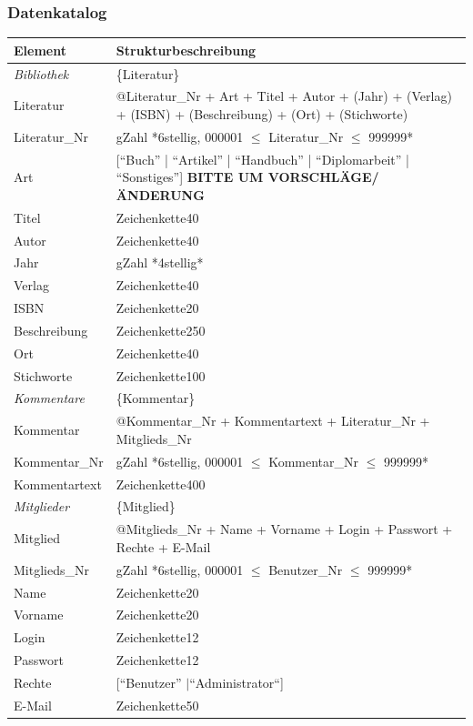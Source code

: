 \subsubsection{Datenkatalog}
\begin{longtable}{|l|p{8.5cm}|}
\hline
Element & Strukturbeschreibung \\
\hline\hline
\endhead

\emph{Bibliothek} & \{Literatur\} \\
\hline
Literatur & @Literatur\_Nr + Art + Titel + Autor + (Jahr) + (Verlag) + (ISBN) + (Beschreibung) + (Ort) + (Stichworte) \\
\hline
Literatur\_Nr & gZahl *6stellig, 000001 $\leq$ Literatur\_Nr $\leq$ 999999* \\
\hline
Art & [``Buch'' | ``Artikel'' | ``Handbuch'' | ``Diplomarbeit'' | ``Sonstiges''] \textbf{BITTE UM VORSCHLÄGE/ÄNDERUNG}\\
\hline
Titel & Zeichenkette40 \\
\hline
Autor & Zeichenkette40 \\
\hline
Jahr & gZahl *4stellig* \\
\hline
Verlag & Zeichenkette40 \\
\hline
ISBN & Zeichenkette20 \\
\hline
Beschreibung & Zeichenkette250 \\
\hline
Ort & Zeichenkette40 \\
\hline
Stichworte & Zeichenkette100 \\
\hline\hline

\emph{Kommentare} & \{Kommentar\} \\
\hline
Kommentar & @Kommentar\_Nr + Kommentartext + Literatur\_Nr + Mitglieds\_Nr\\
\hline
Kommentar\_Nr & gZahl *6stellig, 000001 $\leq$ Kommentar\_Nr $\leq$ 999999* \\
\hline
Kommentartext & Zeichenkette400 \\
\hline\hline

\emph{Mitglieder} & \{Mitglied\} \\
\hline
Mitglied  & @Mitglieds\_Nr  + Name + Vorname + Login + Passwort + Rechte + E-Mail\\
\hline
Mitglieds\_Nr & gZahl *6stellig, 000001 $\leq$ Benutzer\_Nr $\leq$ 999999* \\ 
\hline
Name & Zeichenkette20 \\
\hline
Vorname & Zeichenkette20 \\
\hline
Login & Zeichenkette12 \\
\hline
Passwort & Zeichenkette12 \\
\hline
Rechte & [``Benutzer'' $\mid $``Administrator``] \\
\hline
E-Mail & Zeichenkette50 \\
\hline\hline


\end{longtable}
